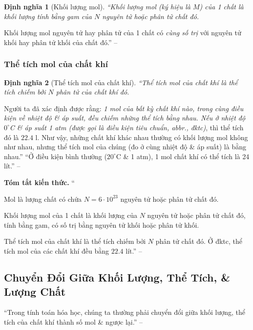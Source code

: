 \documentclass{article}
\numberwithin{equation}{section}
\newtheorem{dinhnghia}{Định nghĩa}[section]
\begin{document}
\begin{dinhnghia}[Khối lượng mol]
	``\emph{Khối lượng mol} (ký hiệu là $M$) của 1 chất là khối lượng tính bằng gam của $N$ nguyên tử hoặc phân tử chất đó.
\end{dinhnghia}
Khối lượng mol nguyên tử hay phân tử của 1 chất có \textit{cùng số trị} với nguyên tử khối hay phân tử khối của chất đó.'' -- \cite[p. 63]{SGK_Hoa_Hoc_8}

\subsubsection{Thể tích mol của chất khí}

\begin{dinhnghia}[Thể tích mol của chất khí]
	``\emph{Thể tích mol của chất khí} là thể tích chiếm bởi $N$ phân tử của chất khí đó.
\end{dinhnghia}
Người ta đã xác định được rằng: \textit{1 mol của bất kỳ chất khí nào, trong cùng điều kiện về nhiệt độ \& áp suất, đều chiếm những thể tích bằng nhau. Nếu ở nhiệt độ $0^\circ$C \& áp suất 1 atm (được gọi là \emph{điều kiện tiêu chuẩn}, abbr., \emph{đktc})}, thì thể tích đó là $22.4$ l. Như vậy, những chất khí khác nhau thường có khối lượng mol không như nhau, nhưng thể tích mol của chúng (đo ở cùng nhiệt độ \& áp suất) là bằng nhau.'' ``Ở điều kiện bình thường ($20^\circ$C \& 1 atm), 1 mol chất khí có thể tích là 24 lít.'' -- \cite[pp. 63--64]{SGK_Hoa_Hoc_8}
\vspace{2mm}

\noindent\textbf{Tóm tắt kiến thức.}
``\begin{enumerate*}
	\item[\textbf{1.}] Mol là lượng chất có chứa $N = 6\cdot 10^{23}$ nguyên tử hoặc phân tử chất đó.
	\item[\textbf{2.}] Khối lượng mol của 1 chất là khối lượng của $N$ nguyên tử hoặc phân tử chất đó, tính bằng gam, có số trị bằng nguyên tử khối hoặc phân tử khối.
	\item[\textbf{3.}] Thể tích mol của chất khí là thể tích chiếm bởi $N$ phân tử chất đó. Ở đktc, thể tích mol của các chất khí đều bằng $22.4$ lít.'' -- \cite[p. 64]{SGK_Hoa_Hoc_8}
\end{enumerate*}


\subsection{Chuyển Đổi Giữa Khối Lượng, Thể Tích, \& Lượng Chất}
``Trong tính toán hóa học, chúng ta thường phải chuyển đổi giữa khối lượng, thể tích của chất khí thành số mol \& ngược lại.'' -- \cite[p. 66]{SGK_Hoa_Hoc_8}
\end{document}
